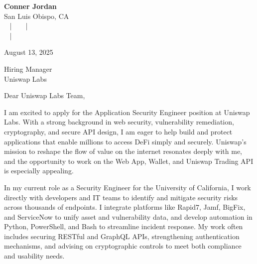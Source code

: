 \documentclass[letterpaper,11pt]{article}
\begin{document}
\begin{center}
  {\Huge \textbf{Conner Jordan}}\\[4pt]
  {\Large San Luis Obispo, CA}\\[4pt]
  \href{tel:+18059759793}{
    \raisebox{-0.05\height}{\faPhone\ (805) 975-9793}} ~ | ~
  \href{mailto:connercharlesjordan@gmail.com}{
    \raisebox{-0.15\height}{\faEnvelope\ connercharlesjordan@gmail.com}} ~ | ~
  \raisebox{-0.15\height}{\faMapMarker\ San Luis Obispo, CA} \\
  \href{https://www.linkedin.com/in/conner-jordan-4b268514a/}{
    \raisebox{-0.15\height}{\faLinkedin\ linkedin.com/in/conner-jordan-4b268514a}} ~ | ~
  \href{https://github.com/cjordan223}{
    \raisebox{-0.15\height}{\faGithub\ github.com/cjordan223}}
\end{center}

\vspace{16pt}

\begin{flushright}
August 13, 2025
\end{flushright}

Hiring Manager\\
Uniswap Labs

\vspace{26pt}

\noindent
Dear Uniswap Labs Team,

\vspace{16pt}

I am excited to apply for the Application Security Engineer position at Uniswap Labs. With a strong background in web security, vulnerability remediation, cryptography, and secure API design, I am eager to help build and protect applications that enable millions to access DeFi simply and securely. Uniswap’s mission to reshape the flow of value on the internet resonates deeply with me, and the opportunity to work on the Web App, Wallet, and Uniswap Trading API is especially appealing.

\vspace{16pt}

In my current role as a Security Engineer for the University of California, I work directly with developers and IT teams to identify and mitigate security risks across thousands of endpoints. I integrate platforms like Rapid7, Jamf, BigFix, and ServiceNow to unify asset and vulnerability data, and develop automation in Python, PowerShell, and Bash to streamline incident response. My work often includes securing RESTful and GraphQL APIs, strengthening authentication mechanisms, and advising on cryptographic controls to meet both compliance and usability needs.
\end{document}
